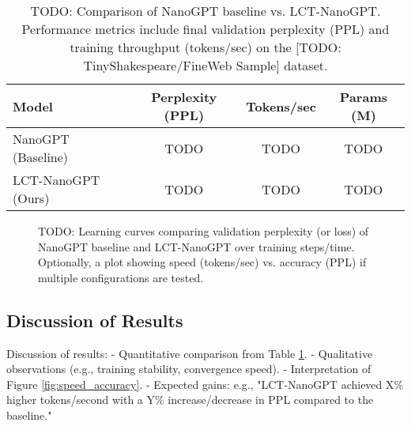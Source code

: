 \begin{table}[htbp]
  \centering
  \caption{TODO: Comparison of NanoGPT baseline vs. LCT-NanoGPT. Performance metrics include final validation perplexity (PPL) and training throughput (tokens/sec) on the [TODO: TinyShakespeare/FineWeb Sample] dataset.}
  \label{tab:main_results}
  \begin{tabular}{@{}lccc@{}}
    \toprule
    Model & Perplexity (PPL) & Tokens/sec & Params (M) \\
    \midrule
    NanoGPT (Baseline) & TODO & TODO & TODO \\
    LCT-NanoGPT (Ours) & TODO & TODO & TODO \\
    \bottomrule
  \end{tabular}
\end{table}

\begin{figure}[htbp]
  \centering
  \caption{TODO: Learning curves comparing validation perplexity (or loss) of NanoGPT baseline and LCT-NanoGPT over training steps/time. Optionally, a plot showing speed (tokens/sec) vs. accuracy (PPL) if multiple configurations are tested.}
  \label{fig:learning_curves_or_pareto}
\end{figure}

\subsection*{Discussion of Results}
Discussion of results:
- Quantitative comparison from Table \ref{tab:main_results}.
- Qualitative observations (e.g., training stability, convergence speed).
- Interpretation of Figure \ref{fig:speed_accuracy}.
- Expected gains: e.g., "LCT-NanoGPT achieved X\% higher tokens/second with a Y\% increase/decrease in PPL compared to the baseline."